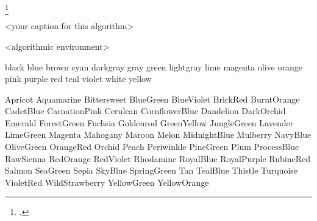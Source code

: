 
\cite{MHJ}         %
\parencite{MHJ}    %
\footcite{MHJ}     %


\begin{algorithm}[H]
\caption{<your caption for this algorithm>}
\label{<your label for references later in your document>}
\begin{algorithmic}[1]  %
<algorithmic environment>
\end{algorithmic}
\end{algorithm}

black
blue 
brown
cyan
darkgray
gray
green
lightgray
lime
magenta
olive
orange
pink
purple
red
teal
violet
white
yellow

Apricot
Aquamarine
Bittersweet
BlueGreen
BlueViolet
BrickRed
BurntOrange
CadetBlue
CarnationPink
Cerulean
CornflowerBlue
Dandelion
DarkOrchid
Emerald
ForestGreen
Fuchsia
Goldenrod
GreenYellow
JungleGreen
Lavender
LimeGreen
Magenta
Mahogany
Maroon
Melon
MidnightBlue
Mulberry
NavyBlue
OliveGreen
OrangeRed
Orchid
Peach
Periwinkle
PineGreen
Plum
ProcessBlue
RawSienna
RedOrange
RedViolet
Rhodamine
RoyalBlue
RoyalPurple
RubineRed
Salmon
SeaGreen
Sepia
SkyBlue
SpringGreen
Tan
TealBlue	 	 	 
Thistle
Turquoise
VioletRed
WildStrawberry
YellowGreen
YellowOrange
